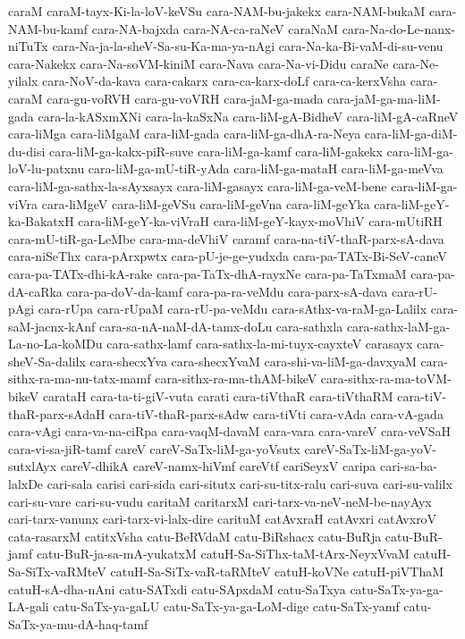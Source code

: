 {caraM
caraM-tayx-Ki-la-loV-keVSu
cara-NAM-bu-jakekx
cara-NAM-bukaM
cara-NAM-bu-kamf
cara-NA-bajxda
cara-NA-ca-raNeV
caraNaM
cara-Na-do-Le-nanx-niTuTx
cara-Na-ja-la-sheV-Sa-su-Ka-ma-ya-nAgi
cara-Na-ka-Bi-vaM-di-su-venu
cara-Nakekx
cara-Na-soVM-kiniM
cara-Nava
cara-Na-vi-Didu
caraNe
cara-Ne-yilalx
cara-NoV-da-kava
cara-cakarx
cara-ca-karx-doLf
cara-ca-kerxVsha
cara-caraM
cara-gu-voRVH
cara-gu-voVRH
cara-jaM-ga-mada
cara-jaM-ga-ma-liM-gada
cara-la-kASxmXNi
cara-la-kaSxNa
cara-liM-gA-BidheV
cara-liM-gA-caRneV
cara-liMga
cara-liMgaM
cara-liM-gada
cara-liM-ga-dhA-ra-Neya
cara-liM-ga-diM-du-disi
cara-liM-ga-kakx-piR-suve
cara-liM-ga-kamf
cara-liM-gakekx
cara-liM-ga-loV-lu-patxnu
cara-liM-ga-mU-tiR-yAda
cara-liM-ga-mataH
cara-liM-ga-meVva
cara-liM-ga-sathx-la-sAyxsayx
cara-liM-gasayx
cara-liM-ga-veM-bene
cara-liM-ga-viVra
cara-liMgeV
cara-liM-geVSu
cara-liM-geVna
cara-liM-geYka
cara-liM-geY-ka-BakatxH
cara-liM-geY-ka-viVraH
cara-liM-geY-kayx-moVhiV
cara-mUtiRH
cara-mU-tiR-ga-LeMbe
cara-ma-deVhiV
caramf
cara-na-tiV-thaR-parx-sA-dava
cara-niSeThx
cara-pArxpwtx
cara-pU-je-ge-yudxda
cara-pa-TATx-Bi-SeV-caneV
cara-pa-TATx-dhi-kA-rake
cara-pa-TaTx-dhA-rayxNe
cara-pa-TaTxmaM
cara-pa-dA-caRka
cara-pa-doV-da-kamf
cara-pa-ra-veMdu
cara-parx-sA-dava
cara-rU-pAgi
cara-rUpa
cara-rUpaM
cara-rU-pa-veMdu
cara-sAthx-va-raM-ga-Lalilx
cara-saM-jacnx-kAnf
cara-sa-nA-naM-dA-tamx-doLu
cara-sathxla
cara-sathx-laM-ga-La-no-La-koMDu
cara-sathx-lamf
cara-sathx-la-mi-tuyx-cayxteV
carasayx
cara-sheV-Sa-dalilx
cara-shecxYva
cara-shecxYvaM
cara-shi-va-liM-ga-davxyaM
cara-sithx-ra-ma-nu-tatx-mamf
cara-sithx-ra-ma-thAM-bikeV
cara-sithx-ra-ma-toVM-bikeV
carataH
cara-ta-ti-giV-vuta
carati
cara-tiVthaR
cara-tiVthaRM
cara-tiV-thaR-parx-sAdaH
cara-tiV-thaR-parx-sAdw
cara-tiVti
cara-vAda
cara-vA-gada
cara-vAgi
cara-va-na-ciRpa
cara-vaqM-davaM
cara-vara
cara-vareV
cara-veVSaH
cara-vi-sa-jiR-tamf
careV
careV-SaTx-liM-ga-yoVsutx
careV-SaTx-liM-ga-yoV-sutxlAyx
careV-dhikA
careV-namx-hiVmf
careVtf
cariSeyxV
caripa
cari-sa-ba-lalxDe
cari-sala
carisi
cari-sida
cari-situtx
cari-su-titx-ralu
cari-suva
cari-su-valilx
cari-su-vare
cari-su-vudu
caritaM
caritarxM
cari-tarx-va-neV-neM-be-nayAyx
cari-tarx-vanunx
cari-tarx-vi-lalx-dire
carituM
catAvxraH
catAvxri
catAvxroV
cata-rasarxM
catitxVsha
catu-BeRVdaM
catu-BiRshacx
catu-BuRja
catu-BuR-jamf
catu-BuR-ja-sa-mA-yukatxM
catuH-Sa-SiThx-taM-tArx-NeyxVvaM
catuH-Sa-SiTx-vaRMteV
catuH-Sa-SiTx-vaR-taRMteV
catuH-koVNe
catuH-piVThaM
catuH-sA-dha-nAni
catu-SATxdi
catu-SApxdaM
catu-SaTxya
catu-SaTx-ya-ga-LA-gali
catu-SaTx-ya-gaLU
catu-SaTx-ya-ga-LoM-dige
catu-SaTx-yamf
catu-SaTx-ya-mu-dA-haq-tamf
}
